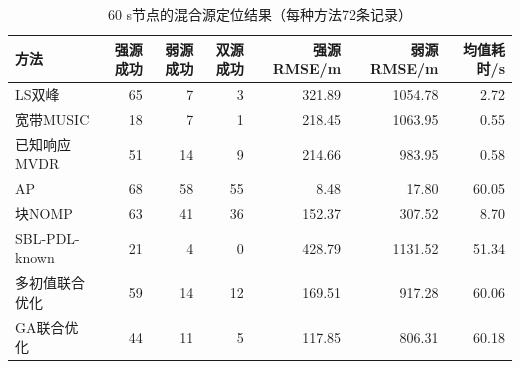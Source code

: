 \begin{table}[htbp]\centering\small\setlength{\tabcolsep}{4pt}
\caption{60 s节点的混合源定位结果（每种方法72条记录）}\label{tab:g10-summary}
\begin{tabular}{lrrrrrr}\toprule
方法 & 强源成功 & 弱源成功 & 双源成功 & 强源RMSE/m & 弱源RMSE/m & 均值耗时/s\\\midrule
LS双峰 & 65 & 7 & 3 & 321.89 & 1054.78 & 2.72\\
宽带MUSIC & 18 & 7 & 1 & 218.45 & 1063.95 & 0.55\\
已知响应MVDR & 51 & 14 & 9 & 214.66 & 983.95 & 0.58\\
AP & 68 & 58 & 55 & 8.48 & 17.80 & 60.05\\
块NOMP & 63 & 41 & 36 & 152.37 & 307.52 & 8.70\\
SBL-PDL-known & 21 & 4 & 0 & 428.79 & 1131.52 & 51.34\\
多初值联合优化 & 59 & 14 & 12 & 169.51 & 917.28 & 60.06\\
GA联合优化 & 44 & 11 & 5 & 117.85 & 806.31 & 60.18\\
\bottomrule\end{tabular}
\end{table}